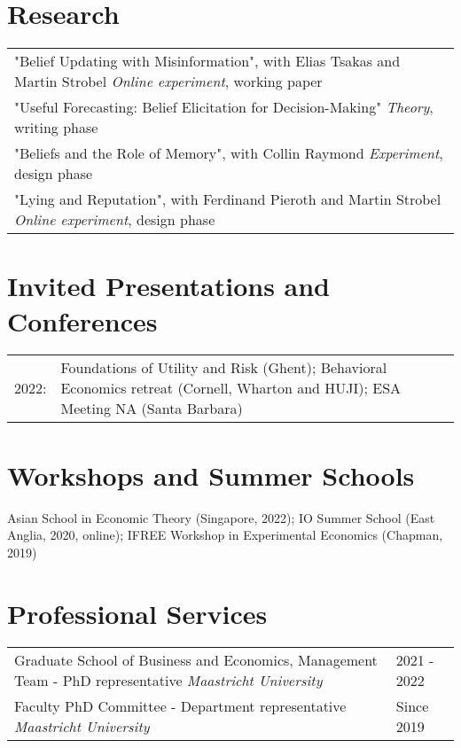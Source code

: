 \documentclass[11pt]{article}
\begin{document}
\section{Research}
\noindent\begin{tabular}{L{17cm}}
	"Belief Updating with Misinformation", with Elias Tsakas and Martin Strobel \newline  \textit{Online experiment}, working paper \\
	\rule{0pt}{4ex}"Useful Forecasting: Belief Elicitation for Decision-Making" \newline  \textit{Theory}, writing phase \\
	\rule{0pt}{4ex}"Beliefs and the Role of Memory", with Collin Raymond \newline  \textit{Experiment}, design phase \\
	\rule{0pt}{4ex}"Lying and Reputation", with Ferdinand Pieroth and Martin Strobel \newline  \textit{Online experiment}, design phase \\
\end{tabular}


\section{Invited Presentations and Conferences}

\noindent\begin{tabular}{L{1cm}L{15cm}}
	2022: &  Foundations of Utility and Risk (Ghent); Behavioral Economics retreat (Cornell, Wharton and HUJI); ESA Meeting NA (Santa Barbara)
\end{tabular}



\section{Workshops and Summer Schools}

\noindent Asian School in Economic Theory (Singapore, 2022); IO Summer School (East Anglia, 2020, online); IFREE Workshop in Experimental Economics (Chapman, 2019)



\section{Professional Services}
 
\noindent\begin{tabular}{L{14cm}L{3cm}}
	\rule{0pt}{4ex}Graduate School of Business and Economics, Management Team - PhD representative \newline \textit{Maastricht University} & 2021 - 2022   \\
	\rule{0pt}{4ex}Faculty PhD Committee - Department representative \newline \textit{Maastricht University}  & Since 2019 
\end{tabular}
\end{document}
